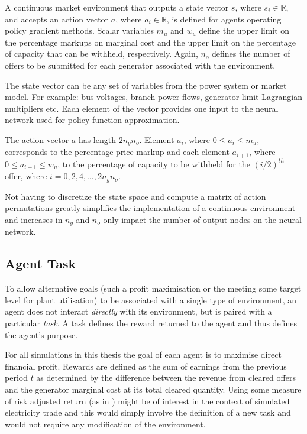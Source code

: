 A continuous market environment that outputs a state vector $s$, where $s_i
\in \mathbb{R}$, and accepts an action vector $a$, where $a_i \in \mathbb{R}$,
is defined for agents operating policy gradient methods.  Scalar variables $m_{u}$ and $w_{u}$ define the upper limit on the percentage
markups on marginal cost and the upper limit on the percentage of capacity that
can be withheld, respectively.  Again, $n_o$ defines the number of offers to be
submitted for each generator associated with the environment.

The state vector can be any set of variables from the power system or market
model.  For example: bus voltages, branch power flows, generator limit
Lagrangian multipliers etc.  Each element of the vector provides one input to the neural network used for policy function approximation.

The action vector $a$ has length $2n_gn_o$.  Element $a_i$, where $0\leq a_i
\leq m_{u}$, corresponds to the percentage price markup and each element
$a_{i+1}$, where $0\leq a_{i+1} \leq w_{u}$, to the percentage of capacity
to be withheld for the $(i/2)^{th}$ offer, where $i=0,2,4,\dotsc,2n_gn_o$.

Not having to discretize the state space and compute a matrix of action
permutations greatly simplifies the implementation of a continuous environment
and increases in $n_g$ and $n_o$ only impact the number of output nodes
on the neural network.

\subsection{Agent Task}
To allow alternative goals (such a profit maximisation or the meeting some
target level for plant utilisation) to be associated with a single type of
environment, an agent does not interact \textit{directly} with its environment,
but is paired with a particular \textit{task}. A task defines the reward
returned to the agent and thus defines the agent's purpose.

For all simulations in this thesis the goal of each agent is to maximise direct
financial profit.  Rewards are defined as the sum of earnings from the previous
period $t$ as determined by the difference between the revenue from cleared
offers and the generator marginal cost at its total cleared quantity.  Using
some measure of risk adjusted return (as in \cite{moody:direct}) might be of
interest in the context of simulated electricity trade and this would simply
involve the definition of a new task and would not require any modification of
the environment.

